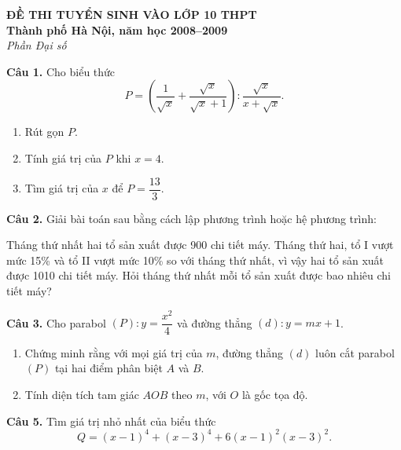 \documentclass[12pt,a4paper]{article}
\begin{document}
\begin{center}
  {\Large\bfseries ĐỀ THI TUYỂN SINH VÀO LỚP 10 THPT}\\
  {\bfseries Thành phố Hà Nội, năm học 2008--2009}\\
  {\itshape Phần Đại số}
\end{center}

\textbf{Câu 1.} Cho biểu thức
\[
P=\left(\frac{1}{\sqrt{x}}+\frac{\sqrt{x}}{\sqrt{x}+1}\right)
:\frac{\sqrt{x}}{x+\sqrt{x}}.
\]
\begin{enumerate}[label=\alph*)]
  \item Rút gọn $P$.
  \item Tính giá trị của $P$ khi $x=4$.
  \item Tìm giá trị của $x$ để $P=\dfrac{13}{3}$.
\end{enumerate}

\textbf{Câu 2.} Giải bài toán sau bằng cách lập phương trình hoặc hệ phương trình:

Tháng thứ nhất hai tổ sản xuất được 900 chi tiết máy. Tháng thứ hai, tổ I vượt mức 15\% và tổ II vượt mức 10\% so với tháng thứ nhất, vì vậy hai tổ sản xuất được 1010 chi tiết máy. Hỏi tháng thứ nhất mỗi tổ sản xuất được bao nhiêu chi tiết máy?

\textbf{Câu 3.} Cho parabol $(P):y=\dfrac{x^2}{4}$ và đường thẳng $(d):y=mx+1$.
\begin{enumerate}[label=\alph*)]
  \item Chứng minh rằng với mọi giá trị của $m$, đường thẳng $(d)$ luôn cắt parabol $(P)$ tại hai điểm phân biệt $A$ và $B$.
  \item Tính diện tích tam giác $AOB$ theo $m$, với $O$ là gốc tọa độ.
\end{enumerate}

\textbf{Câu 5.} Tìm giá trị nhỏ nhất của biểu thức
\[
Q=(x-1)^4+(x-3)^4+6(x-1)^2(x-3)^2.
\]
\end{document}
